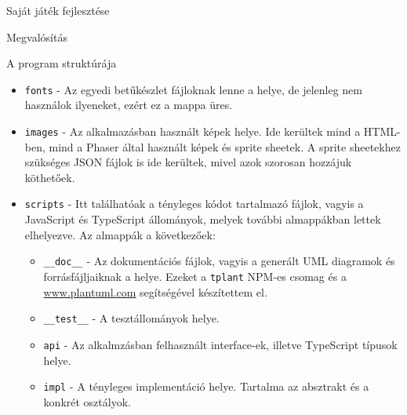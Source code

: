 \begin{MyChapter}{Saját játék fejlesztése}
\begin{MySection}{Megvalósítás}
\begin{MySubSection}{A program struktúrája}
\begin{itemize}
				\item \texttt{fonts} - Az egyedi betűkészlet fájloknak lenne a helye, de jelenleg nem használok ilyeneket, ezért ez a mappa üres.
				
				\item \texttt{images} - Az alkalmazásban használt képek helye. Ide kerültek mind a HTML-ben, mind a Phaser által használt képek és sprite sheetek. A sprite sheetekhez szükséges JSON fájlok is ide kerültek, mivel azok szorosan hozzájuk köthetőek.
				
				\item \texttt{scripts} - Itt találhatóak a tényleges kódot tartalmazó fájlok, vagyis a JavaScript és TypeScript állományok, melyek további almappákban lettek elhelyezve. Az almappák a következőek:
				\begin{itemize}
					\item \texttt{\_\_doc\_\_} - Az dokumentációs fájlok, vagyis a generált UML diagramok és forrásfájljaiknak a helye. Ezeket a \texttt{tplant} NPM-es csomag és a \url{www.plantuml.com} segítségével készítettem el.
					
					\item \texttt{\_\_test\_\_} - A tesztállományok helye.
					
					\item \texttt{api} - Az alkalmzásban felhasznált interface-ek, illetve TypeScript típusok helye.
					
					\item \texttt{impl} - A tényleges implementáció helye. Tartalma az absztrakt és a konkrét osztályok.
				\end{itemize}
			\end{itemize}
		\end{MySubSection}
		

\end{MySection}
\end{MyChapter}
